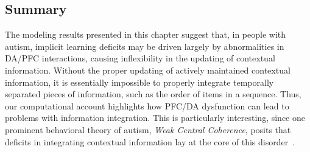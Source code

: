 \subsection{Summary}
The modeling results presented in this chapter suggest that, in people with autism, implicit learning deficits may be driven largely by abnormalities in DA/PFC interactions, causing inflexibility in the updating of contextual information.  Without the proper updating of actively maintained contextual information, it is essentially impossible to properly integrate temporally separated pieces of information, such as the order of items in a sequence.  Thus, our computational account highlights how PFC/DA dysfunction can lead to problems with information integration.  This is particularly interesting, since one prominent behavioral theory of autism, \emph{Weak Central Coherence}, posits that deficits in integrating contextual information lay at the core of this disorder~\cite{HappeF:1999:WCC}.  
